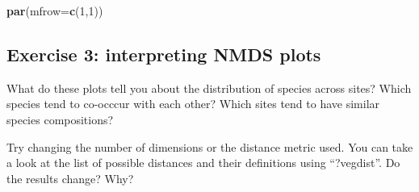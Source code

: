 \documentclass[
]{book}
\newenvironment{Shaded}{\begin{snugshade}}{\end{snugshade}}
\newcommand{\DataTypeTok}[1]{\textcolor[rgb]{0.13,0.29,0.53}{#1}}
\newcommand{\DecValTok}[1]{\textcolor[rgb]{0.00,0.00,0.81}{#1}}
\newcommand{\KeywordTok}[1]{\textcolor[rgb]{0.13,0.29,0.53}{\textbf{#1}}}
\newcommand{\NormalTok}[1]{#1}
\begin{document}
\begin{Shaded}
\begin{Highlighting}[]
\KeywordTok{par}\NormalTok{(}\DataTypeTok{mfrow=}\KeywordTok{c}\NormalTok{(}\DecValTok{1}\NormalTok{,}\DecValTok{1}\NormalTok{))}
\end{Highlighting}
\end{Shaded}

\hypertarget{exercise-3-interpreting-nmds-plots}{%
\subsection{Exercise 3: interpreting NMDS plots}\label{exercise-3-interpreting-nmds-plots}}

What do these plots tell you about the distribution of species across sites? Which species tend to co-occcur with each other? Which sites tend to have similar species compositions?

Try changing the number of dimensions or the distance metric used. You can take a look at the list of possible distances and their definitions using ``?vegdist''. Do the results change? Why?

  
\end{document}
